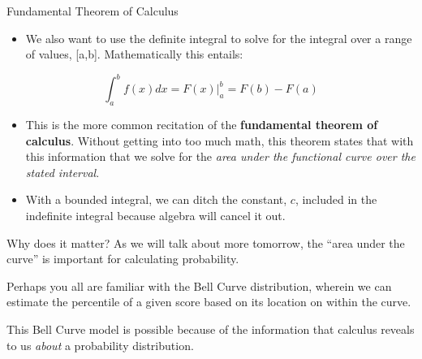 \documentclass[
  ignorenonframetext,
]{beamer}
\providecommand{\tightlist}{%
  \setlength{\itemsep}{0pt}\setlength{\parskip}{0pt}}
\begin{document}
\begin{frame}{Fundamental Theorem of Calculus}
\protect\hypertarget{fundamental-theorem-of-calculus}{}
\begin{itemize}[<+->]
\tightlist
\item
  We also want to use the definite integral to solve for the integral
  over a range of values, {[}a,b{]}. Mathematically this entails:
\end{itemize}

\[ \int_a^b f(x)dx = F(x) |^b_a = F(b)-F(a)\]

\begin{itemize}[<+->]
\tightlist
\item
  This is the more common recitation of the \textbf{fundamental theorem
  of calculus}. Without getting into too much math, this theorem states
  that with this information that we solve for the \emph{area under the
  functional curve over the stated interval}.
\end{itemize}

\begin{itemize}[<+->]
\tightlist
\item
  With a bounded integral, we can ditch the constant, \(c\), included in
  the indefinite integral because algebra will cancel it out.
\end{itemize}
\end{frame}

\begin{frame}{Why does it matter?}
\protect\hypertarget{why-does-it-matter}{}
As we will talk about more tomorrow, the ``area under the curve'' is
important for calculating probability.

Perhaps you all are familiar with the Bell Curve distribution, wherein
we can estimate the percentile of a given score based on its location on
within the curve.

This Bell Curve model is possible because of the information that
calculus reveals to us \emph{about} a probability distribution.
\end{frame}
\end{document}
